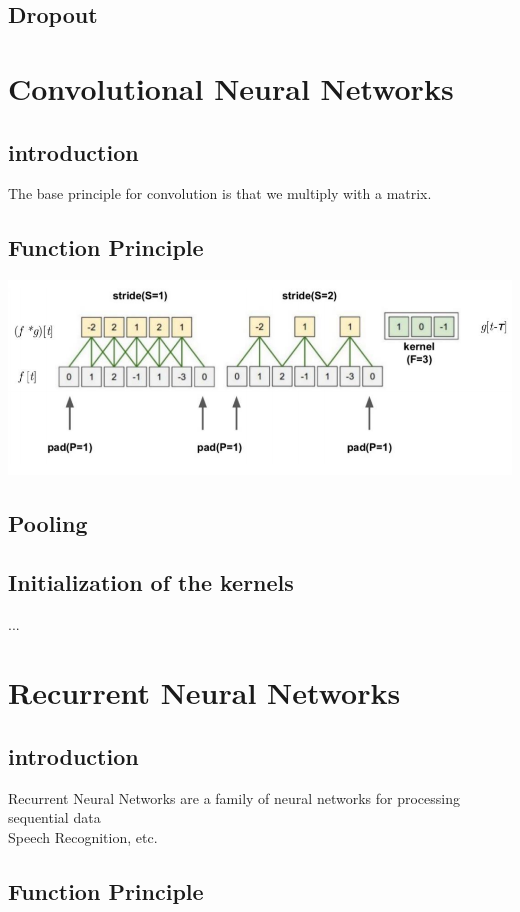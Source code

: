 \documentclass[a4paper,10pt,titlepage]{report}
\begin{document}
\subsection{Dropout}




\newpage
\section{Convolutional Neural Networks}

\subsection{introduction}
The base principle for convolution is that we multiply with a matrix.
\subsection{Function Principle}
\includegraphics[scale=0.1]{CNN.png}
\subsection{Pooling}
\subsection{Initialization of the kernels}
...

\newpage
\section{Recurrent Neural Networks}
\subsection{introduction}
Recurrent Neural Networks are a family of neural networks for processing sequential data \\

Speech Recognition, etc.

\subsection{Function Principle}
\end{document}
